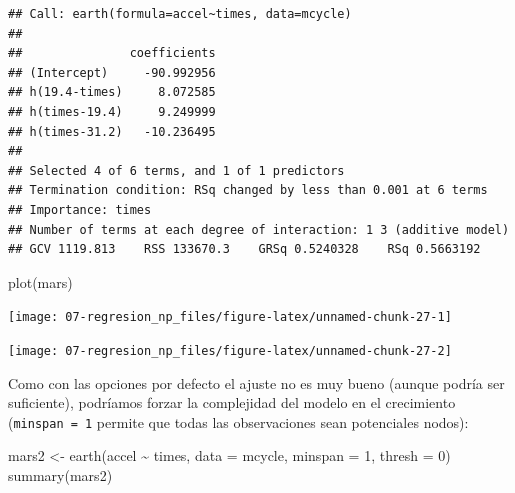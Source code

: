 \documentclass[
  spanish,
]{book}
\newenvironment{Shaded}{\begin{snugshade}}{\end{snugshade}}
\newcommand{\AttributeTok}[1]{\textcolor[rgb]{0.77,0.63,0.00}{#1}}
\newcommand{\DecValTok}[1]{\textcolor[rgb]{0.00,0.00,0.81}{#1}}
\newcommand{\FunctionTok}[1]{\textcolor[rgb]{0.00,0.00,0.00}{#1}}
\newcommand{\NormalTok}[1]{#1}
\newcommand{\OtherTok}[1]{\textcolor[rgb]{0.56,0.35,0.01}{#1}}
\newcommand{\SpecialCharTok}[1]{\textcolor[rgb]{0.00,0.00,0.00}{#1}}
\newcommand{\StringTok}[1]{\textcolor[rgb]{0.31,0.60,0.02}{#1}}
\theoremstyle{break}
\theoremstyle{definition}
\theoremstyle{definition}
\theoremstyle{definition}
\theoremstyle{definition}
\theoremstyle{remark}
\begin{document}
\begin{verbatim}
## Call: earth(formula=accel~times, data=mcycle)
## 
##               coefficients
## (Intercept)     -90.992956
## h(19.4-times)     8.072585
## h(times-19.4)     9.249999
## h(times-31.2)   -10.236495
## 
## Selected 4 of 6 terms, and 1 of 1 predictors
## Termination condition: RSq changed by less than 0.001 at 6 terms
## Importance: times
## Number of terms at each degree of interaction: 1 3 (additive model)
## GCV 1119.813    RSS 133670.3    GRSq 0.5240328    RSq 0.5663192
\end{verbatim}

\begin{Shaded}
\begin{Highlighting}[]
\FunctionTok{plot}\NormalTok{(mars)}
\end{Highlighting}
\end{Shaded}

\begin{center}\texttt{[image: 07-regresion\_np\_files/figure-latex/unnamed-chunk-27-1]} \end{center}

\begin{Shaded}
\end{Shaded}

\begin{center}\texttt{[image: 07-regresion\_np\_files/figure-latex/unnamed-chunk-27-2]} \end{center}

Como con las opciones por defecto el ajuste no es muy bueno (aunque podría ser suficiente), podríamos forzar la complejidad del modelo en el crecimiento (\texttt{minspan\ =\ 1} permite que todas las observaciones sean potenciales nodos):

\begin{Shaded}
\begin{Highlighting}[]
\NormalTok{mars2 }\OtherTok{\textless{}{-}} \FunctionTok{earth}\NormalTok{(accel }\SpecialCharTok{\textasciitilde{}}\NormalTok{ times, }\AttributeTok{data =}\NormalTok{ mcycle, }\AttributeTok{minspan =} \DecValTok{1}\NormalTok{, }\AttributeTok{thresh =} \DecValTok{0}\NormalTok{)}
\FunctionTok{summary}\NormalTok{(mars2)}
\end{Highlighting}
\end{Shaded}
\end{document}
